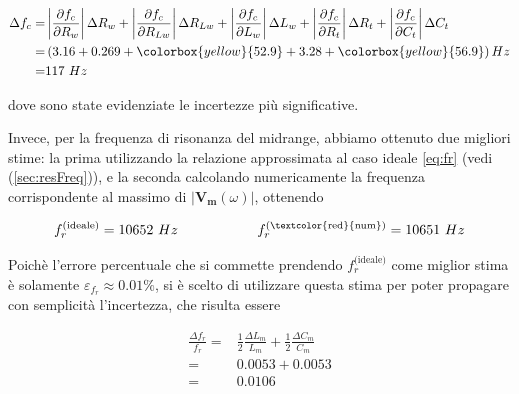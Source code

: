\documentclass[12pt,italian]{article}
\newcommand{\err}[1]{\textcolor{red}{#1}}
\begin{document}
\begin{equation*}
	\begin{aligned}
		\Delta f_{c} = & \left|\frac{\partial f_{c}}{\partial R_{w}}\right| \Delta R_{w} + \left|\frac{\partial f_{c}}{\partial R_{Lw}}\right| \Delta R_{Lw} + \left|\frac{\partial f_{c}}{\partial L_{w}}\right| \Delta L_{w} + \left|\frac{\partial f_{c}}{\partial R_{t}}\right| \Delta R_{t} + \left|\frac{\partial f_{c}}{\partial C_{t}}\right| \Delta C_{t} \\
		=              & \left( 3.16 + 0.269 + \colorbox{yellow}{52.9} + 3.28 + \colorbox{yellow}{56.9} \right) Hz                                                                                                                                                                                                                                                 \\
		=              & 117 \ Hz
	\end{aligned}
\end{equation*}

\noindent
dove sono state evidenziate le incertezze più significative.

Invece, per la frequenza di risonanza del midrange, abbiamo ottenuto due
migliori stime: la prima utilizzando la relazione approssimata al caso ideale
\eqref{eq:fr} (vedi (\cref{sec:resFreq})), e la seconda calcolando
numericamente la frequenza corrispondente al massimo di $ \left|
	\mathbf{V_{m}}(\omega) \right| $, ottenendo

\begin{equation*}
	f_{r}^{\text{(ideale)}} = 10652 \ Hz \hspace{2cm} f_{r}^{\text{(\err{num})}} = 10651 \ Hz
\end{equation*}

\noindent
Poichè l'errore percentuale che si commette prendendo $f_{r}^{\text{(ideale)}}$ come miglior
stima è solamente  $\varepsilon_{f_r} \approx 0.01\%$, si è scelto di utilizzare questa stima per poter propagare
con semplicità l'incertezza, che risulta essere

\begin{equation*}
	\begin{aligned}
		\frac{\Delta f_{r}}{f_{r}} = & \frac{1}{2} \frac{\Delta L_{m}}{L_{m}} + \frac{1}{2} \frac{\Delta C_{m}}{C_{m}} \\
		=                            & 0.0053 + 0.0053                                                                 \\
		=                            & 0.0106
	\end{aligned}
\end{equation*}
\end{document}
